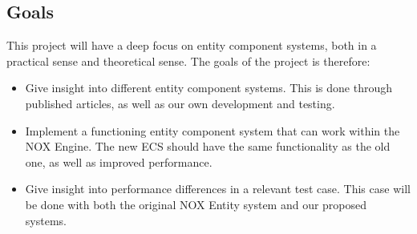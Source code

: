 \subsection{Goals}
This project will have a deep focus on entity component systems, both in a practical sense and theoretical sense.
The goals of the project is therefore:
\begin{itemize}
    \item 
        Give insight into different entity component systems. 
        This is done through published articles, as well as our own development and testing.
    
    \item 
        Implement a functioning entity component system that can work within the NOX Engine.
        The new ECS should have the same functionality as the old one, as well as improved performance.

    \item
        Give insight into performance differences in a relevant test case. 
        This case will be done with both the original NOX Entity system and our proposed systems.
\end{itemize}